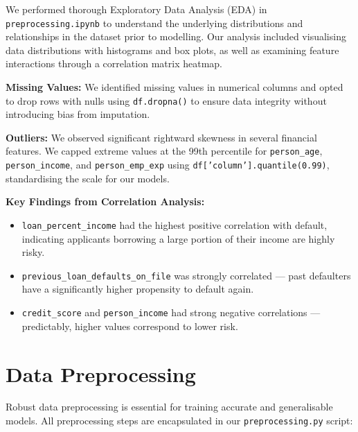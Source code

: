 \documentclass[12pt, a4paper]{article}
\begin{document}
We performed thorough Exploratory Data Analysis (EDA) in \texttt{preprocessing.ipynb} to understand the underlying distributions and relationships in the dataset prior to modelling. Our analysis included visualising data distributions with histograms and box plots, as well as examining feature interactions through a correlation matrix heatmap.

\textbf{Missing Values:} We identified missing values in numerical columns and opted to drop rows with nulls using \texttt{df.dropna()} to ensure data integrity without introducing bias from imputation.

\textbf{Outliers:} We observed significant rightward skewness in several financial features. We capped extreme values at the 99th percentile for \texttt{person\_age}, \texttt{person\_income}, and \texttt{person\_emp\_exp} using \texttt{df['column'].quantile(0.99)}, standardising the scale for our models.

\textbf{Key Findings from Correlation Analysis:}
\begin{itemize}[leftmargin=2cm]
  \item \texttt{loan\_percent\_income} had the highest positive correlation with default, indicating applicants borrowing a large portion of their income are highly risky.
  \item \texttt{previous\_loan\_defaults\_on\_file} was strongly correlated --- past defaulters have a significantly higher propensity to default again.
  \item \texttt{credit\_score} and \texttt{person\_income} had strong negative correlations --- predictably, higher values correspond to lower risk.
\end{itemize}

\section{Data Preprocessing}

Robust data preprocessing is essential for training accurate and generalisable models. All preprocessing steps are encapsulated in our \texttt{preprocessing.py} script:
\end{document}
